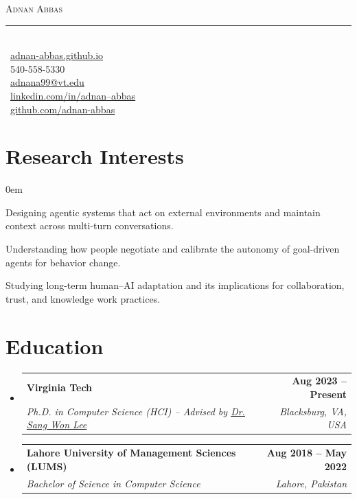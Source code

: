 \documentclass[letterpaper,11pt]{article}
\makeatletter
\newcommand{\resumeSubheading}[4]{
  \vspace{-2pt}\item
    \begin{tabular*}{1.0\textwidth}[t]{l@{\extracolsep{\fill}}r}
      \textbf{#1} & \textbf{\small #2} \\
      \textit{\small#3} & \textit{\small #4} \\
    \end{tabular*}\vspace{-7pt}
}
\newcommand{\resumeSubHeadingListStart}{\begin{itemize}[leftmargin=0.0in, label={}]}
\newcommand{\resumeSubHeadingListEnd}{\end{itemize}}
\makeatother
\begin{document}
{\huge \scshape Adnan Abbas} \\[-2pt]
\rule{4cm}{0.4pt} \\[6pt]

\small
\faGlobe\ \href{https://adnan-abbas.github.io}{adnan-abbas.github.io} \\[3pt]
\faPhone\ 540-558-5330 \\[3pt]
\faEnvelope\ \href{mailto:adnana99@vt.edu}{adnana99@vt.edu} \\[3pt]
\faLinkedin\ \href{https://linkedin.com/in/adnan--abbas/}{linkedin.com/in/adnan--abbas} \\[3pt]
\faGithub\ \href{https://github.com/adnan-abbas}{github.com/adnan-abbas}
\section{Research Interests}
 \begin{itemize}[leftmargin=0.15in]
    \itemsep0em
\small{\item{Designing agentic systems that act on external environments and maintain context across multi-turn conversations.}}
\small{\item{Understanding how people negotiate and calibrate the autonomy of goal-driven agents for behavior change.}}
\small{\item{Studying long-term human–AI adaptation and its implications for collaboration, trust, and knowledge work practices.}}
 \end{itemize}


\section{Education}
\resumeSubHeadingListStart
    \resumeSubheading
      {Virginia Tech}{Aug 2023 -- Present}
      {Ph.D. in Computer Science (HCI) -- Advised by \href{https://echolab.cs.vt.edu/sangwonlee/}{Dr. Sang Won Lee}}{Blacksburg, VA, USA}
    \resumeSubheading
      {Lahore University of Management Sciences (LUMS)}{Aug 2018 -- May 2022}
      {Bachelor of Science in Computer Science}{Lahore, Pakistan}
\resumeSubHeadingListEnd
\end{document}
